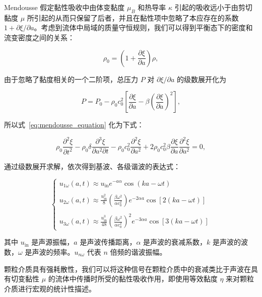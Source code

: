 Mendousse 假定黏性吸收中由体变黏度 $\mu_{B}$ 和热导率 $\kappa$ 引起的吸收远小于由剪切黏度 $\mu$ 所引起的从而只保留了后者，并且在黏性项中忽略了本应存在的系数 $1+\partial\xi/\partial a$。考虑到流体中局域的质量守恒规则，我们可以得到平衡态下的密度和流变密度之间的关系：

\begin{equation}
  \rho_{0} = \left(1 + \frac{\partial\xi}{\partial a}\right)\rho,
\end{equation}

由于忽略了黏度相关的一个二阶项，总压力 $P$ 对 $\partial\xi/\partial a$ 的级数展开化为

\begin{equation}
  P = P_{0} - \rho_{0}c_{0}^{2}\left[\frac{\partial\xi}{\partial a} - \beta\left(\frac{\partial\xi}{\partial a}\right)^{2}\right],
\end{equation}

所以式~\eqref{eq:mendousse_equation} 化为下式：

\begin{equation}
  \rho_{0}\frac{\partial^{2}\xi}{\partial t^{2}} - \rho_{0}\delta\frac{\partial^{3}\xi}{\partial a^{2}\partial t} - \rho_{0}c_{0}^{2}\frac{\partial^{2}\xi}{\partial a^{2}} + 2\rho_{0}c_{0}^{2}\beta\frac{\partial\xi}{\partial a}\frac{\partial^{2}\xi}{\partial a^{2}} = 0,
\end{equation}

通过级数展开求解，依次得到基波、各级谐波的表达式：

\begin{equation}
  \begin{cases}
    u_{1\omega}(a,t) \approx u_{\text{in}}e^{-a\alpha}\cos{(ka-\omega t)}\\
    \\
    u_{2\omega}(a,t) \approx \frac{u_{\text{in}}^{2}}{8}\left(\frac{\beta\omega^{2}}{\alpha c_{0}^{2}}\right)e^{-2\alpha a}\cos{[2(ka-\omega t)]}\\
    \\
    u_{3\omega}(a,t) \approx \frac{u_{\text{in}}^{3}}{48}\left(\frac{\beta\omega^{2}}{\alpha c_{0}^{2}}\right)^{2}e^{-3\alpha a}\cos{[3(ka-\omega t)]}
    \end{cases}
\end{equation}

其中 $u_{\text{in}}$ 是声源振幅，$a$ 是声波传播距离，$\alpha$ 是声波的衰减系数，$k$ 是声波的波数，$\omega$ 是声波的频率。$u_{n\omega}$ 代表 $n$ 倍频的谐波振幅。

颗粒介质具有强耗散性，我们可以将这种信号在颗粒介质中的衰减类比于声波在具有切变黏性 $\mu$ 的流体中传播时所受的黏性吸收作用，即使用等效黏度 $\eta$ 来对颗粒介质进行宏观的统计性描述。


